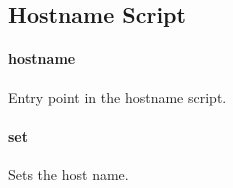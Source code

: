 \subsection{Hostname Script}

\paragraph{hostname}


Entry point in the hostname script.

\paragraph{set}


Sets the host name.

